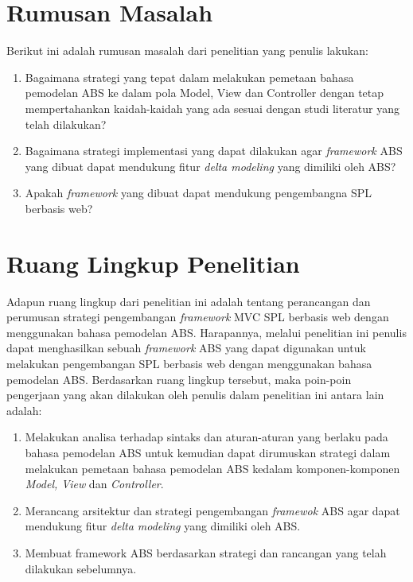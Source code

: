 \section{Rumusan Masalah}
\noindent
Berikut ini adalah rumusan masalah dari penelitian yang penulis lakukan:

\begin{enumerate}
    \item Bagaimana strategi yang tepat dalam melakukan pemetaan bahasa pemodelan ABS ke dalam pola Model, View dan Controller dengan tetap mempertahankan kaidah-kaidah yang ada sesuai dengan studi literatur yang telah dilakukan?
    \item Bagaimana strategi implementasi yang dapat dilakukan agar \textit{framework} ABS yang dibuat dapat mendukung fitur \textit{delta modeling} yang dimiliki oleh ABS?
    \item Apakah \textit{framework} yang dibuat dapat mendukung pengembangna SPL berbasis web?
\end{enumerate}

\section{Ruang Lingkup Penelitian}
\noindent
Adapun ruang lingkup dari penelitian ini adalah tentang perancangan dan perumusan strategi pengembangan \textit{framework} MVC SPL berbasis web dengan menggunakan bahasa pemodelan ABS. Harapannya, melalui penelitian ini penulis dapat menghasilkan sebuah \textit{framework} ABS yang dapat digunakan untuk melakukan pengembangan SPL berbasis web dengan menggunakan bahasa pemodelan ABS. Berdasarkan ruang lingkup tersebut, maka poin-poin pengerjaan yang akan dilakukan oleh penulis dalam penelitian ini antara lain adalah:

\begin{enumerate}
    \item Melakukan analisa terhadap sintaks dan aturan-aturan yang berlaku pada bahasa pemodelan ABS untuk kemudian dapat dirumuskan strategi dalam melakukan pemetaan bahasa pemodelan ABS kedalam komponen-komponen \textit{Model, View} dan \textit{Controller}.
    \item Merancang arsitektur dan strategi pengembangan \textit{framewok} ABS agar dapat mendukung fitur \textit{delta modeling} yang dimiliki oleh ABS.
    \item Membuat framework ABS berdasarkan strategi dan rancangan yang telah dilakukan sebelumnya.
\end{enumerate}

